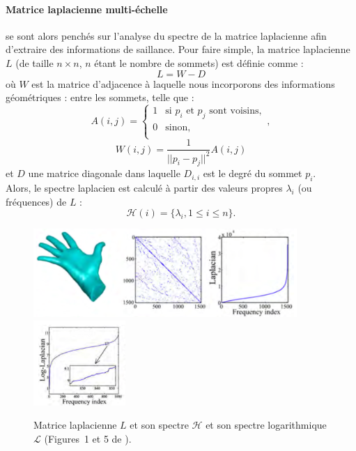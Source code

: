 \paragraph{Matrice laplacienne multi-échelle}
%
 se sont alors penchés sur l'analyse du spectre de la
matrice laplacienne afin d'extraire des informations de saillance. Pour faire
simple, la matrice laplacienne $L$ (de taille $n \times n$, $n$ étant le nombre
de sommets) est définie comme :
%
\begin{equation}
  L = W - D
\end{equation}
%
où $W$ est la matrice d’adjacence à laquelle nous incorporons des informations
géométriques : entre les sommets, telle que :
%
\begin{equation}
  A(i,j) =
  \begin{cases}
    1   & \text{si } p_i \text{ et } p_j \text{ sont voisins},\\
    0   & \text{sinon},\\
  \end{cases},
\end{equation}
%
\begin{equation}
  W(i,j) = \frac{1}{{||p_i - p_j||}^2}A(i,j)
\end{equation}
%
et $D$ une matrice diagonale dans laquelle $D_{i,i}$ est le degré du sommet
$p_i$.
%
\\
%
Alors, le spectre laplacien est calculé à partir des valeurs propres $\lambda_i$
(ou fréquences) de $L$ :
%
\begin{equation}
  \mathcal{H}(i) = \{ \lambda_i, 1 \le i \le n \}.
\end{equation}
%
\begin{figure}[ht]{
    \begin{center}
    \includegraphics[width=10cm]{images/Feature/LaplacianSpectrum}
    \includegraphics[width=3.5cm]{images/Feature/LaplacianSpectrumLog}
    \end{center}}
    \caption[Matrice laplacienne et son spectre.]{Matrice laplacienne $L$ et son spectre $\mathcal{H}$ et son spectre logarithmique $\mathcal{L}$ (Figures~1 et 5 de \cite{Song2014}).
      \label{fig:laplacian-spectrum}}
\end{figure}
